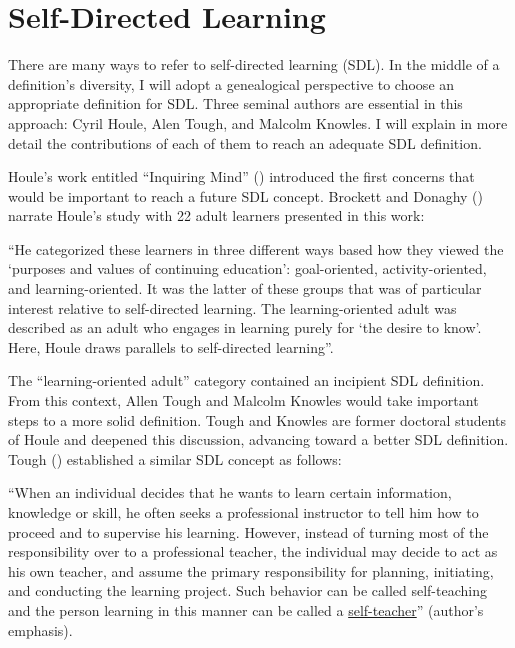 \chapter{Self-Directed Learning}
\label{chap:sdl}

There are many ways to refer to self-directed learning (\gls{SDL}). In the middle of a definition’s diversity, I will adopt a genealogical perspective to choose an appropriate definition for \gls{SDL}. Three seminal authors are essential in this approach: Cyril Houle, Alen Tough, and Malcolm Knowles. I will explain in more detail the contributions of each of them to reach an adequate \gls{SDL} definition.

Houle’s work entitled ``Inquiring Mind'' (\citeyear{houle:1961}) introduced the first concerns that would be important to reach a future SDL concept. Brockett and Donaghy (\citeyear{brockett:2005}) narrate Houle’s study with 22 adult learners presented in this work:
\begin{citacao}
    ``He categorized these learners in three different ways based how they viewed the ‘purposes and values of continuing education’: goal-oriented, activity-oriented, and learning-oriented. It was the latter of these groups that was of particular interest relative to self-directed learning. The learning-oriented adult was described as an adult who engages in learning purely for ‘the desire to know’. Here, Houle draws parallels to self-directed learning''.
\end{citacao}

The “learning-oriented adult” category contained an incipient \gls{SDL} definition. From this context, Allen Tough and Malcolm Knowles would take important steps to a more solid definition. Tough and Knowles are former doctoral students of Houle and deepened this discussion, advancing toward a better \gls{SDL} definition. Tough (\citeyear{tough:1967}) established a similar \gls{SDL} concept as follows:
\begin{citacao}
    “When an individual decides that he wants to learn certain information, knowledge or skill, he often seeks a professional instructor to tell him how to proceed and to supervise his learning. However, instead of turning most of the responsibility over to a professional teacher, the individual may decide to act as his own teacher, and assume the primary responsibility for planning, initiating, and conducting the learning project. Such behavior can be called self-teaching and the person learning in this manner can be called a \underline{self-teacher}” (author’s emphasis).
\end{citacao}

